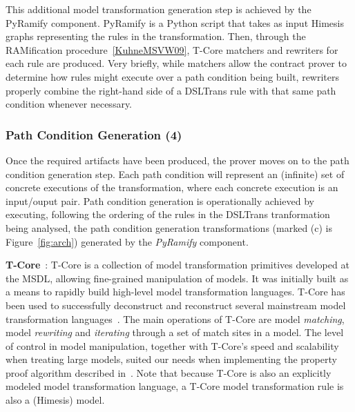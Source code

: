 This additional model transformation generation step is achieved by the PyRamify
component. PyRamify is a Python script that
takes as input Himesis graphs representing the rules in the transformation.
Then, through the RAMification procedure~\ref{KuhneMSVW09}, T-Core matchers and
rewriters for each rule are produced. Very briefly, while matchers allow the
contract prover to determine how rules might execute over a path condition being
built, rewriters properly combine the right-hand side of a DSLTrans rule with
that same path condition whenever necessary.




\subsubsection{Path Condition Generation (4)}

Once the required artifacts have been produced, the prover moves
on to the path condition generation step. Each path condition will represent an
(infinite) set of concrete executions of the transformation, where each concrete
execution is an input/ouput pair. Path condition generation is operationally
achieved by executing, following the ordering of the rules in the DSLTrans
tranformation being analysed, the path condition generation transformations
(marked (c) is Figure~\ref{fig:arch}) generated by the \emph{PyRamify}
component.

  \textbf{T-Core}~\cite{Syriani2010a}: T-Core is a collection of model transformation
  primitives developed at the MSDL, allowing fine-grained manipulation of
  models. It was initially built as a means to rapidly build
  high-level model transformation languages. T-Core has been used to
  successfully deconstruct and reconstruct several mainstream model transformation
  languages~\cite{}. The main operations of T-Core are model \emph{matching},
  model \emph{rewriting} and \emph{iterating} through a set of match sites in a model.
  The level of control in model manipulation, together with T-Core's speed and
  scalability when treating large models, suited our needs when
  implementing the property proof algorithm described in~\cite{Lucio2014}. Note that because
  T-Core is also an explicitly modeled model transformation language, a T-Core
  model transformation rule is also a (Himesis) model.\\



